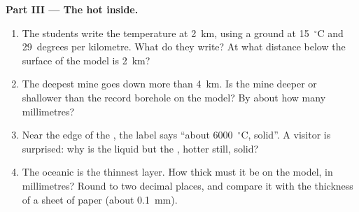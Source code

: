 \begin{problem}
\medskip
\noindent\textbf{Part III --- The hot inside.}
\begin{enumerate}[resume]
  \item The students write the temperature at 2~km, using a ground at
        15~$^\circ$C and 29~degrees per kilometre. What do they write? At
        what distance below the surface of the model is 2~km?
  \item The deepest mine goes down more than 4~km. Is the mine deeper or
        shallower than the record borehole on the model? By about how many
        millimetres?
  \item Near the edge of the , the label says ``about
        6000~$^\circ$C, solid''. A visitor is surprised: why is the  liquid but the , hotter still, solid?
  \item The oceanic  is the thinnest layer. How thick must it be on
        the model, in millimetres? Round to two decimal places, and compare
        it with the thickness of a sheet of paper (about 0.1~mm).
\end{enumerate}
\end{problem}
